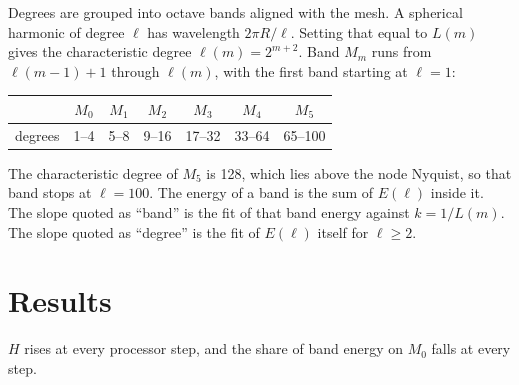 \documentclass[11pt]{article}
\begin{document}
Degrees are grouped into octave bands aligned with the mesh. A spherical harmonic of degree \(\ell\) has wavelength \(2\pi R / \ell\). Setting that equal to \(L(m)\) gives the characteristic degree \(\ell(m) = 2^{m+2}\). Band \(M_m\) runs from \(\ell(m-1)+1\) through \(\ell(m)\), with the first band starting at \(\ell = 1\):

\begin{center}
\begin{tabular}{lcccccc}
\toprule
& \(M_0\) & \(M_1\) & \(M_2\) & \(M_3\) & \(M_4\) & \(M_5\) \\
\midrule
degrees & 1--4 & 5--8 & 9--16 & 17--32 & 33--64 & 65--100 \\
\bottomrule
\end{tabular}
\end{center}

The characteristic degree of \(M_5\) is 128, which lies above the node Nyquist, so that band stops at \(\ell = 100\). The energy of a band is the sum of \(E(\ell)\) inside it. The slope quoted as ``band'' is the fit of that band energy against \(k = 1/L(m)\). The slope quoted as ``degree'' is the fit of \(E(\ell)\) itself for \(\ell \ge 2\).

\section{Results}

\(H\) rises at every processor step, and the share of band energy on \(M_0\) falls at every step.
\end{document}
